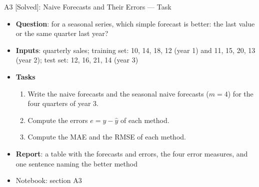 \begin{frame}{A3 [Solved]: Naive Forecasts and Their Errors --- Task}
\itemsize{\small}
\begin{itemize}
\item \textbf{Question}: for a seasonal series, which simple forecast is better: the last value or the same quarter last year?
\item \textbf{Inputs}: quarterly sales; training set: 10, 14, 18, 12 (year 1) and 11, 15, 20, 13 (year 2); test set: 12, 16, 21, 14 (year 3)
\item \textbf{Tasks}
\begin{enumerate}
    \item Write the naive forecasts and the seasonal naive forecasts ($m = 4$) for the four quarters of year 3.
    \item Compute the errors $e = y - \hat y$ of each method.
    \item Compute the MAE and the RMSE of each method.
\end{enumerate}
\item \textbf{Report}: a table with the forecasts and errors, the four error measures, and one sentence naming the better method
\item Notebook: section A3
\end{itemize}
\end{frame}

